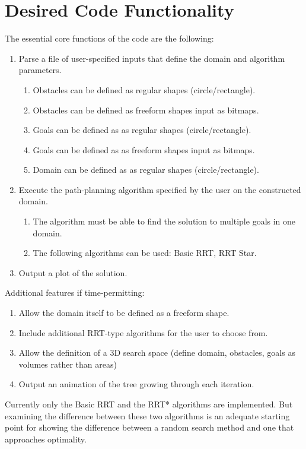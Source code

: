 \documentclass[10pt]{article}
\begin{document}
\newpage
\section{Desired Code Functionality}

	The essential core functions of the code are the following:
	
	\begin{enumerate}
		\item Parse a file of user-specified inputs that define the domain and algorithm parameters.
		\begin{enumerate}
			\item Obstacles can be defined as regular shapes (circle/rectangle).
			\item Obstacles can be defined as freeform shapes input as bitmaps.
			\item Goals can be defined as as regular shapes (circle/rectangle).
			\item Goals can be defined as as freeform shapes input as bitmaps.
			\item Domain can be defined as as regular shapes (circle/rectangle).
		\end{enumerate}	
		\item Execute the path-planning algorithm specified by the user on the constructed domain.
		\begin{enumerate}
				\item The algorithm must be able to find the solution to multiple goals in one domain.
				\item The following algorithms can be used: Basic RRT, RRT Star.
		\end{enumerate}		
		\item Output a plot of the solution.
	\end{enumerate}

	Additional features if time-permitting:
	\begin{enumerate}
		\item Allow the domain itself to be defined as a freeform shape.
		\item Include additional RRT-type algorithms for the user to choose from.
		\item Allow the definition of a 3D search space (define domain, obstacles, goals as volumes rather than areas)
		\item Output an animation of the tree growing through each iteration.
	\end{enumerate}

	Currently only the Basic RRT and the RRT* algorithms are implemented. But examining the difference between these two algorithms is an adequate starting point for showing the difference between a random search method and one that approaches optimality.
\end{document}
